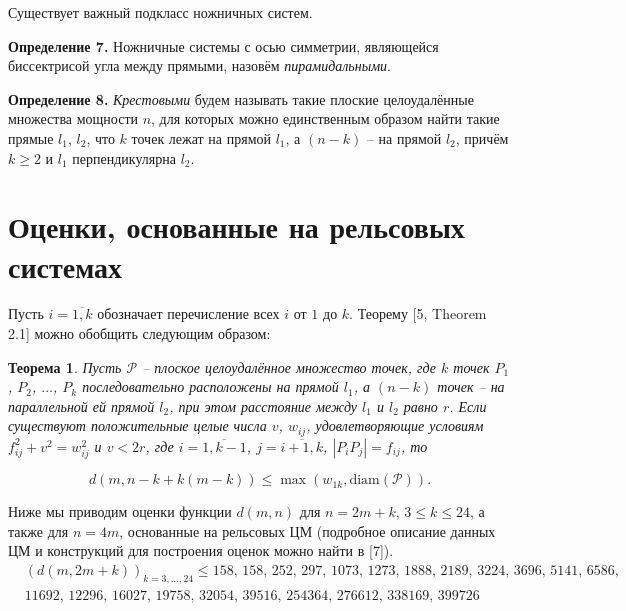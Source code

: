 \documentclass[12pt]{article}
\theoremstyle{theorem}
\newtheorem{theorem}{Теорема}
\theoremstyle{dfn}
\theoremstyle{remark}
\begin{document}
Существует важный подкласс ножничных систем.

\par
\textbf{Определение 7.}
Ножничные системы с осью симметрии,
являющейся биссектрисой угла между прямыми, назовём \textit{пирамидальными}.

\par
\textbf{Определение 8.}
\textit{Крестовыми} будем называть такие плоские целоудалённые множества мощности $n$, для которых можно единственным
образом найти такие прямые $l_1$, $l_2$, что $k$ точек лежат на прямой $l_1$, а $(n - k)$ -- на прямой $l_2$, причём $k \geq 2$ и
$l_1$ перпендикулярна $l_2$.

\section{Оценки, основанные на рельсовых системах}

Пусть $i = \overline{1, k}$ обозначает перечисление всех $i$
от $1$ до $k$.
Теорему [5, Theorem 2.1] можно обобщить
следующим образом:

\begin{theorem}
	Пусть $\mathcal{P}$ -- плоское целоудалённое множество точек, где
	$k$ точек $P_1$, $P_2$, $\ldots$, $P_k$ последовательно расположены на прямой $l_1$,
	а $(n - k)$ точек -- на параллельной ей прямой $l_2$, при этом расстояние между $l_1$ и $l_2$ равно $r$.
	Если существуют положительные целые числа $v$, $w_{ij}$, удовлетворяющие
	условиям $f_{ij}^{2} + v^{2} = w_{ij}^{2}$ и $v < 2r$, где
	$i = \overline{1, k - 1}$, $j = \overline{i + 1, k}$, $|P_{i}P_{j}| = f_{ij}$,
	то

	\begin{equation}
		d(m, n - k + k(m - k)) \leq \max(w_{1k}, \operatorname{diam(\mathcal{P})})
		.
	\end{equation}

\end{theorem}

Ниже мы приводим оценки функции $d(m, n)$ для $n = 2m + k$, $3 \leq k \leq 24$, а также для $n = 4m$, основанные на рельсовых ЦМ (подробное описание данных ЦМ и конструкций для построения оценок можно найти в [7]).
\begin{align*}
&(d(m, 2m + k))_{k = 3, \ldots, 24} \leq 158,\, 158,\, 252,\, 297,\, 1073,\, 1273,\, 1888,\, 2189,\, 3224,\, 3696,\, 5141,\, 6586,\, \\
&11692,\, 12296,\, 16027,\, 19758,\, 32054,\, 39516,\, 254364,\, 276612,\, 338169,\, 399726
\end{align*}
\end{document}

